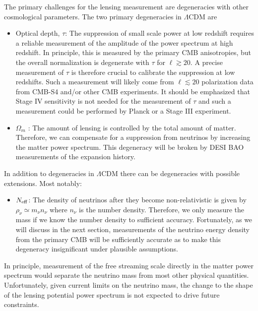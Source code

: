 The primary challenges for the lensing measurement are degeneracies with other cosmological parameters.  The two primary degeneracies in $\Lambda$CDM are
\begin{itemize}
\item Optical depth, $\tau$: The suppression of small scale power at low redshift requires a reliable measurement of the amplitude of the power spectrum at high redshift.  In principle, this is measured by the primary CMB anisotropies, but the overall normalization is degenerate with $\tau$ for $\ell \gtrsim 20$.  A precise measurement of $\tau$ is therefore crucial to calibrate the suppression at low redshifts.  Such a measurement will likely come from $\ell \lesssim 20$ polarization data from CMB-S4 and/or other CMB experiments.  It should be emphasized that Stage IV sensitivity is not needed for the measurement of $\tau$ and such a measurement could be performed by Planck or a Stage III experiment.


\item $\Omega_m$ : The amount of lensing is controlled by the total amount of matter.  Therefore, we can compensate for a suppression from neutrinos by increasing the matter power spectrum.  This degeneracy will be broken by DESI BAO measurements of the expansion history.
\end{itemize}
In addition to degeneracies in $\Lambda$CDM there can be degeneracies with possible extensions.  Most notably:
\begin{itemize}
\item $N_{\rm eff}$: The density of neutrinos after they become non-relativistic is given by $\rho_\nu \simeq m_\nu n_\nu$ where $n_\nu$ is the number density.  Therefore, we only measure the mass if we know the number density to sufficient accuracy.  Fortunately, as we will discuss in the next section, measurements of the neutrino energy density from the primary CMB will be sufficiently accurate as to make this degeneracy insignificant under plausible assumptions.
\end{itemize}
In principle, measurement of the free streaming scale directly in the matter power spectrum would separate the neutrino mass from most other physical quantities.  Unfortunately, given current limits on the neutrino mass, the change to the shape of the lensing potential power spectrum is not expected to drive future constraints.  

